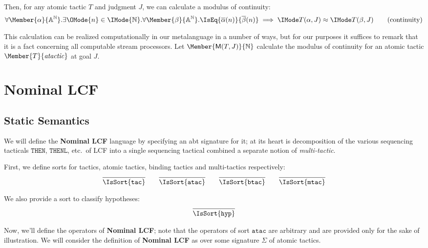 Then, for any atomic tactic $T$ and judgment $J$, we can calculate a
modulus of continuity:
\begin{equation}
  \forall \Member{\alpha}{\MLStream{\MLAtom}}.
  \exists \OMode{n}\in\IMode{\MLNat}.
  \forall \Member{\beta}{\MLStream{\MLAtom}}.
    \IsEq{\bar{\alpha}(n)}{\bar{\beta}(n)}\implies \KleeneEq{T(\alpha,J)}{T(\beta,J)}
  \tag{continuity}
\end{equation}

This calculation can be realized computationally in our metalanguage in a
number of ways, but for our purposes it suffices to remark that it is a fact
concerning all computable stream processors. Let
$\Member{\ModC{T}{J}}{\MLNat}$ calculate the modulus of continuity
for an atomic tactic $\Member{T}{\LCFAtomicTactic}$ at goal $J$.

\section{Nominal LCF}

\subsection{Static Semantics}

\newcommand\SortATac{\mathtt{atac}}
\newcommand\SortBTac{\mathtt{btac}}
\newcommand\SortTac{\mathtt{tac}}
\newcommand\SortMTac{\mathtt{mtac}}
\newcommand\SortHyp{\mathtt{hyp}}

We will define the \textbf{Nominal LCF} language by specifying an abt signature
for it; at its heart is decomposition of the various sequencing tacticals
$\mathtt{THEN}$, $\mathtt{THENL}$, etc.\ of LCF into a single sequencing
tactical combined a separate notion of \emph{multi-tactic}.

First, we define sorts for tactics, atomic tactics, binding tactics and multi-tactics
respectively:
\begin{gather*}
  \infer{
    \IsSort{\SortTac}
  }{}
  \qquad
  \infer{
    \IsSort{\SortATac}
  }{}
  \qquad
  \infer{
    \IsSort{\SortBTac}
  }{}
  \qquad
  \infer{
    \IsSort{\SortMTac}
  }{}
\end{gather*}

We also provide a sort to classify hypotheses:
\[
  \infer{
    \IsSort{\SortHyp}
  }{
  }
\]

Now, we'll define the operators of \textbf{Nominal LCF}; note that the
operators of sort $\SortATac$ are arbitrary and are provided only for the sake
of illustration. We will consider the definition of \textbf{Nominal LCF} as
over some signature $\Sigma$ of atomic tactics.

